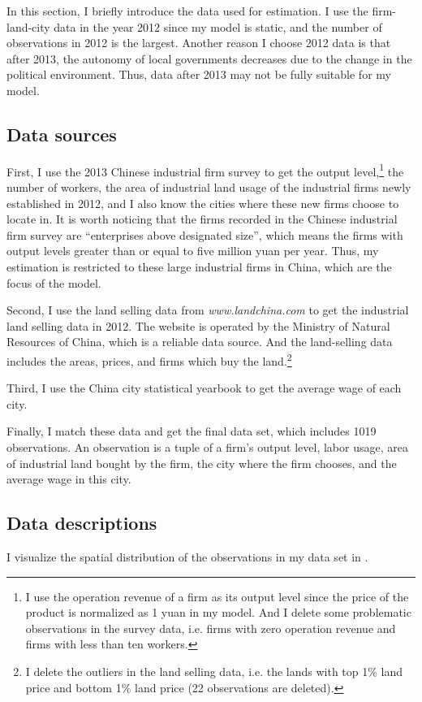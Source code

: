 In this section, I briefly introduce the data used for estimation.
I use the firm-land-city data in the year 2012 since
my model is static, and the number of observations in 2012 is the largest.
Another reason I choose 2012 data is that after 2013, the autonomy of local governments decreases
due to the change in the political environment. Thus, data after 2013 may not be
fully suitable for my model.

\subsection{Data sources}
First, I use the 2013 Chinese industrial firm survey to get the output level,\footnote{
    I use the operation revenue of a firm as its output level since
    the price of the product is normalized as 1 yuan in my model.
    And I delete some problematic observations in the survey data,
    i.e. firms with zero operation revenue and firms with less than ten workers.}
the number of workers, the area of industrial land usage of the industrial firms
newly established in 2012, and I also know the cities where these new firms choose
to locate in.
It is worth noticing that the firms recorded in the Chinese industrial firm survey
are ``enterprises above designated size'', which means the firms with output levels
greater than or equal to five million yuan per year. Thus, my estimation is restricted
to these large industrial firms in China, which are the focus of the model.

Second, I use the land selling data from \textit{www.landchina.com} to get the
industrial land selling data in 2012. The website is operated by
the Ministry of Natural Resources of China, which is a reliable data source.
And the land-selling data includes the areas, prices, and firms which buy the land.\footnote{
    I delete the outliers in the land selling data, i.e. the lands with
    top 1\% land price and bottom 1\% land price (22 observations are deleted).}

Third, I use the China city statistical yearbook to get the average wage of
each city.

Finally, I match these data and get the final data set, which includes 1019 observations.
An observation is a tuple of a firm's output level, labor usage, area of industrial land bought by the firm,
the city where the firm chooses, and the average wage in this city.

\subsection{Data descriptions}
I visualize the spatial distribution of the observations in my data set in
.

